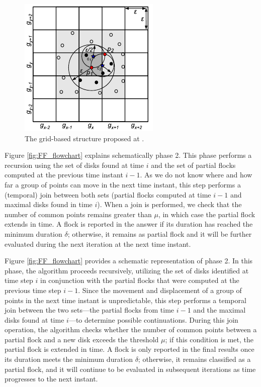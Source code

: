 \begin{figure}
    \centering
    \includegraphics[width=0.6\linewidth]{figures/grid2}
    \caption{The grid-based structure proposed at \cite{vieira_2009}.}\label{fig:grid}
\end{figure}

Figure \ref{fig:FF_flowchart} explains schematically phase 2. This phase performs a recursion using the set of disks found at time $i$ and the set of partial flocks computed at the  previous time instant $i-1$.  As we do not know where and how far a group of points can move in the next time instant, this step performs a (temporal) join between both sets (partial flocks computed at time $i-1$ and maximal disks found in time $i$).  When a join is performed, we check that the number of common points remains greater than $\mu$, in which case the partial flock extends in time. A flock is reported in the answer if its duration has reached the minimum duration $\delta$; otherwise, it remains as partial flock and it will be further evaluated during the next iteration at the next time instant.

Figure \ref{fig:FF_flowchart} provides a schematic representation of phase 2. In this phase, the algorithm proceeds recursively, utilizing the set of disks identified at time step $i$ in conjunction with the partial flocks that were computed at the previous time step $i-1$. Since the movement and displacement of a group of points in the next time instant is unpredictable, this step performs a temporal join between the two sets—the partial flocks from time $i-1$ and the maximal disks found at time $i$—to determine possible continuations. During this join operation, the algorithm checks whether the number of common points between a partial flock and a new disk exceeds the threshold $\mu$; if this condition is met, the partial flock is extended in time. A flock is only reported in the final results once its duration meets the minimum duration $\delta$; otherwise, it remains classified as a partial flock, and it will continue to be evaluated in subsequent iterations as time progresses to the next instant.

